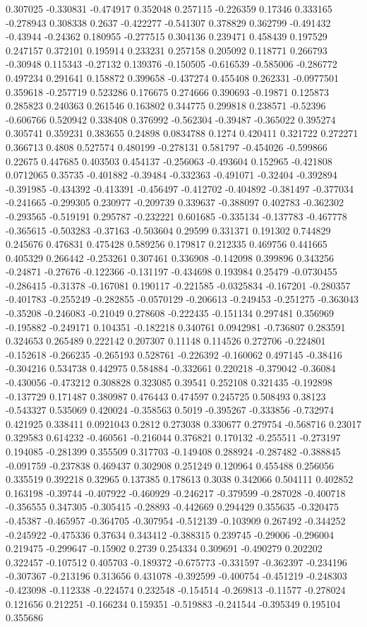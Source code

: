 0.307025 -0.330831 -0.474917 0.352048 0.257115 -0.226359 0.17346 0.333165 -0.278943 0.308338 0.2637 -0.422277 -0.541307 0.378829 0.362799 -0.491432 -0.43944 -0.24362 0.180955 -0.277515 0.304136 0.239471 0.458439 0.197529 0.247157 0.372101 0.195914 0.233231 0.257158 0.205092 0.118771 0.266793 -0.30948 0.115343 -0.27132 0.139376 -0.150505 -0.616539 -0.585006 -0.286772 0.497234 0.291641 0.158872 0.399658 -0.437274 0.455408 0.262331 -0.0977501 0.359618 -0.257719 0.523286 0.176675 0.274666 0.390693 -0.19871 0.125873 0.285823 0.240363 0.261546 0.163802 0.344775 0.299818 0.238571 -0.52396 -0.606766 0.520942 0.338408 0.376992 -0.562304 -0.39487 -0.365022 0.395274 0.305741 0.359231 0.383655 0.24898 0.0834788 0.1274 0.420411 0.321722 0.272271 0.366713 0.4808 0.527574 0.480199 -0.278131 0.581797 -0.454026 -0.599866 0.22675 0.447685 0.403503 0.454137 -0.256063 -0.493604 0.152965 -0.421808 0.0712065 0.35735 -0.401882 -0.39484 -0.332363 -0.491071 -0.32404 -0.392894 -0.391985 -0.434392 -0.413391 -0.456497 -0.412702 -0.404892 -0.381497 -0.377034 -0.241665 -0.299305 0.230977 -0.209739 0.339637 -0.388097 0.402783 -0.362302 -0.293565 -0.519191 0.295787 -0.232221 0.601685 -0.335134 -0.137783 -0.467778 -0.365615 -0.503283 -0.37163 -0.503604 0.29599 0.331371 0.191302 0.744829 0.245676 0.476831 0.475428 0.589256 0.179817 0.212335 0.469756 0.441665 0.405329 0.266442 -0.253261 0.307461 0.336908 -0.142098 0.399896 0.343256 -0.24871 -0.27676 -0.122366 -0.131197 -0.434698 0.193984 0.25479 -0.0730455 -0.286415 -0.31378 -0.167081 0.190117 -0.221585 -0.0325834 -0.167201 -0.280357 -0.401783 -0.255249 -0.282855 -0.0570129 -0.206613 -0.249453 -0.251275 -0.363043 -0.35208 -0.246083 -0.21049 0.278608 -0.222435 -0.151134 0.297481 0.356969 -0.195882 -0.249171 0.104351 -0.182218 0.340761 0.0942981 -0.736807 0.283591 0.324653 0.265489 0.222142 0.207307 0.11148 0.114526 0.272706 -0.224801 -0.152618 -0.266235 -0.265193 0.528761 -0.226392 -0.160062 0.497145 -0.38416 -0.304216 0.534738 0.442975 0.584884 -0.332661 0.220218 -0.379042 -0.36084 -0.430056 -0.473212 0.308828 0.323085 0.39541 0.252108 0.321435 -0.192898 -0.137729 0.171487 0.380987 0.476443 0.474597 0.245725 0.508493 0.38123 -0.543327 0.535069 0.420024 -0.358563 0.5019 -0.395267 -0.333856 -0.732974 0.421925 0.338411 0.0921043 0.2812 0.273038 0.330677 0.279754 -0.568716 0.23017 0.329583 0.614232 -0.460561 -0.216044 0.376821 0.170132 -0.255511 -0.273197 0.194085 -0.281399 0.355509 0.317703 -0.149408 0.288924 -0.287482 -0.388845 -0.091759 -0.237838 0.469437 0.302908 0.251249 0.120964 0.455488 0.256056 0.335519 0.392218 0.32965 0.137385 0.178613 0.3038 0.342066 0.504111 0.402852 0.163198 -0.39744 -0.407922 -0.460929 -0.246217 -0.379599 -0.287028 -0.400718 -0.356555 0.347305 -0.305415 -0.28893 -0.442669 0.294429 0.355635 -0.320475 -0.45387 -0.465957 -0.364705 -0.307954 -0.512139 -0.103909 0.267492 -0.344252 -0.245922 -0.475336 0.37634 0.343412 -0.388315 0.239745 -0.29006 -0.296004 0.219475 -0.299647 -0.15902 0.2739 0.254334 0.309691 -0.490279 0.202202 0.322457 -0.107512 0.405703 -0.189372 -0.675773 -0.331597 -0.362397 -0.234196 -0.307367 -0.213196 0.313656 0.431078 -0.392599 -0.400754 -0.451219 -0.248303 -0.423098 -0.112338 -0.224574 0.232548 -0.154514 -0.269813 -0.11577 -0.278024 0.121656 0.212251 -0.166234 0.159351 -0.519883 -0.241544 -0.395349 0.195104 0.355686 